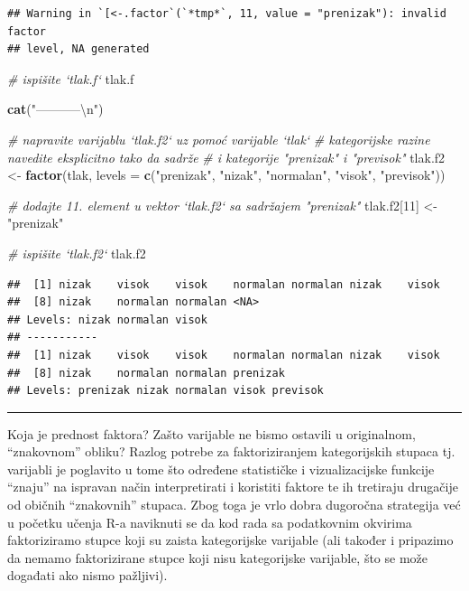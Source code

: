 \documentclass[]{book}
\newenvironment{Shaded}{\begin{snugshade}}{\end{snugshade}}
\newcommand{\KeywordTok}[1]{\textcolor[rgb]{0.13,0.29,0.53}{\textbf{#1}}}
\newcommand{\DataTypeTok}[1]{\textcolor[rgb]{0.13,0.29,0.53}{#1}}
\newcommand{\DecValTok}[1]{\textcolor[rgb]{0.00,0.00,0.81}{#1}}
\newcommand{\CharTok}[1]{\textcolor[rgb]{0.31,0.60,0.02}{#1}}
\newcommand{\StringTok}[1]{\textcolor[rgb]{0.31,0.60,0.02}{#1}}
\newcommand{\CommentTok}[1]{\textcolor[rgb]{0.56,0.35,0.01}{\textit{#1}}}
\newcommand{\NormalTok}[1]{#1}
\theoremstyle{definition}
\theoremstyle{definition}
\theoremstyle{definition}
\theoremstyle{remark}
\begin{document}
\begin{verbatim}
## Warning in `[<-.factor`(`*tmp*`, 11, value = "prenizak"): invalid factor
## level, NA generated
\end{verbatim}

\begin{Shaded}
\begin{Highlighting}[]
\CommentTok{# ispišite `tlak.f`}
\NormalTok{tlak.f}

\KeywordTok{cat}\NormalTok{(}\StringTok{"-----------}\CharTok{\textbackslash{}n}\StringTok{"}\NormalTok{)}

\CommentTok{# napravite varijablu `tlak.f2` uz pomoć varijable `tlak`}
\CommentTok{# kategorijske razine navedite eksplicitno tako da sadrže}
\CommentTok{# i kategorije "prenizak" i "previsok"}
\NormalTok{tlak.f2 <-}\StringTok{ }\KeywordTok{factor}\NormalTok{(tlak, }\DataTypeTok{levels =} \KeywordTok{c}\NormalTok{(}\StringTok{"prenizak"}\NormalTok{, }\StringTok{"nizak"}\NormalTok{, }\StringTok{"normalan"}\NormalTok{,}
                    \StringTok{"visok"}\NormalTok{, }\StringTok{"previsok"}\NormalTok{))}

\CommentTok{# dodajte 11. element u vektor `tlak.f2` sa sadržajem "prenizak"}
\NormalTok{tlak.f2[}\DecValTok{11}\NormalTok{] <-}\StringTok{ "prenizak"}

\CommentTok{# ispišite `tlak.f2`}
\NormalTok{tlak.f2}
\end{Highlighting}
\end{Shaded}

\begin{verbatim}
##  [1] nizak    visok    visok    normalan normalan nizak    visok   
##  [8] nizak    normalan normalan <NA>    
## Levels: nizak normalan visok
## -----------
##  [1] nizak    visok    visok    normalan normalan nizak    visok   
##  [8] nizak    normalan normalan prenizak
## Levels: prenizak nizak normalan visok previsok
\end{verbatim}

\begin{center}\rule{0.5\linewidth}{\linethickness}\end{center}

Koja je prednost faktora? Zašto varijable ne bismo ostavili u
originalnom, ``znakovnom'' obliku? Razlog potrebe za faktoriziranjem
kategorijskih stupaca tj. varijabli je poglavito u tome što određene
statističke i vizualizacijske funkcije ``znaju'' na ispravan način
interpretirati i koristiti faktore te ih tretiraju drugačije od običnih
``znakovnih'' stupaca. Zbog toga je vrlo dobra dugoročna strategija već
u početku učenja R-a naviknuti se da kod rada sa podatkovnim okvirima
faktoriziramo stupce koji su zaista kategorijske varijable (ali također
i pripazimo da nemamo faktorizirane stupce koji nisu kategorijske
varijable, što se može događati ako nismo pažljivi).
\end{document}
